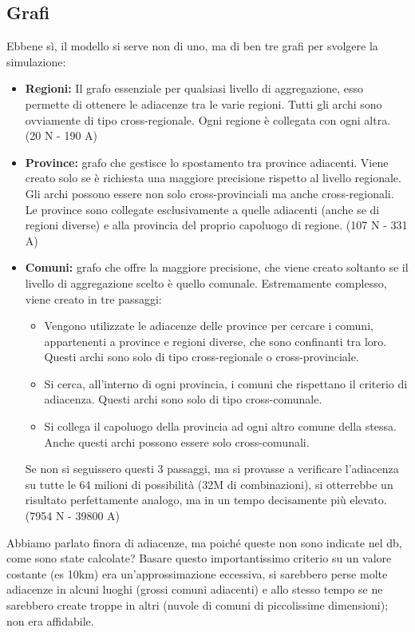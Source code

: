 \documentclass[a4paper, 12pt]{article}
\begin{document}
	\subsection{Grafi}
		Ebbene sì, il modello si serve non di uno, ma di ben tre grafi per svolgere la simulazione:
		\begin{itemize}
			\item \textbf{Regioni:} Il grafo essenziale per qualsiasi livello di aggregazione, esso permette di ottenere le adiacenze tra le varie regioni.
			Tutti gli archi sono ovviamente di tipo cross-regionale.
			Ogni regione è collegata con ogni altra. (20 N - 190 A)
			\item \textbf{Province:} grafo che gestisce lo spostamento tra province adiacenti.
			Viene creato solo se è richiesta una maggiore precisione rispetto al livello regionale. Gli archi possono essere non solo cross-provinciali ma anche cross-regionali. Le province sono collegate esclusivamente a quelle adiacenti (anche se di regioni diverse) e alla provincia del proprio capoluogo di regione. (107 N - 331 A)
			\item \textbf{Comuni:} grafo che offre la maggiore precisione, che viene creato soltanto se il livello di aggregazione scelto è quello comunale.
			Estremamente complesso, viene creato in tre passaggi:
			\begin{itemize}
				\item Vengono utilizzate le adiacenze delle province per cercare i comuni, appartenenti a province e regioni diverse, che sono confinanti tra loro.
				Questi archi sono solo di tipo cross-regionale o cross-provinciale.
				\item Si cerca, all'interno di ogni provincia, i comuni che rispettano il criterio di adiacenza. Questi archi sono solo di tipo cross-comunale.
				\item Si collega il capoluogo della provincia ad ogni altro comune della stessa. Anche questi archi possono essere solo cross-comunali.
			\end{itemize}
			Se non si seguissero questi 3 passaggi, ma si provasse a verificare l'adiacenza su tutte le 64 milioni di possibilità (32M di combinazioni), si otterrebbe un risultato perfettamente analogo, ma in un tempo decisamente più elevato. (7954 N - 39800 A)
		\end{itemize}
		Abbiamo parlato finora di adiacenze, ma poiché queste non sono indicate nel db, come sono state calcolate?
		Basare questo importantissimo criterio su un valore costante (es 10km) era un'approssimazione eccessiva, si sarebbero perse molte adiacenze in alcuni luoghi (grossi comuni adiacenti) e allo stesso tempo se ne sarebbero create troppe in altri (nuvole di comuni di piccolissime dimensioni); non era affidabile.
\end{document}
